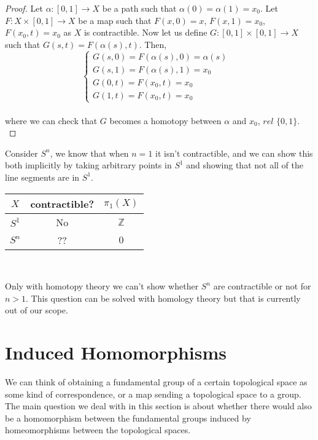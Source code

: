 \documentclass[paper=a4, fontsize=11pt]{scrartcl}
\begin{document}
\begin{proof}
	Let $\alpha:[0,1]\to X$ be a path such that $\alpha(0)=\alpha(1)=x_0$. Let $F:X\times[0,1]\to X$ be a map such that $F(x,0)=x$, $F(x,1)=x_0$, $F(x_0,t)=x_0$ as $X$ is contractible. Now let us define $G:[0,1]\times[0,1] \to X$ such that $G(s,t)=F(\alpha(s),t)$. Then, 
	\begin{equation}\nonumber
		\begin{cases}
		G(s,0)=F(\alpha(s),0)=\alpha(s) & \\
		G(s,1)=F(\alpha(s),1)=x_0 & \\
		G(0,t)=F(x_0,t)=x_0 & \\
		G(1,t)= F(x_0,t)=x_0
		\end{cases}
	\end{equation}\\
	where we can check that $G$ becomes a homotopy between $\alpha$ and $x_0$, $rel$ $\{0,1\}$.\\
\end{proof}

Consider $S^n$, we know that when $n=1$ it isn't contractible, and we can show this both implicitly by taking arbitrary points in $S^1$ and showing that not all of the line segments are in $S^1$. 

\begin{table}[h!]
	\centering
	\begin{tabular}{|c|c|c|}
		\hline
		$X$   & contractible? & $\pi_1(X)$   \\ \hline
		$S^1$ & No            & $\mathbb{Z}$ \\ \hline
		$S^n$ & ??            & $0$          \\ \hline
	\end{tabular}\\
\end{table}

Only with homotopy theory we can't show whether $S^n$ are contractible or not for $n>1$. This question can be solved with homology theory but that is currently out of our scope.  
\vspace{0.15in}


\section{Induced Homomorphisms}
\vspace{0.15in}
We can think of obtaining a fundamental group of a certain topological space as some kind of correspondence, or a map sending a topological space to a group. The main question we deal with in this section is about whether there would also be a homomorphism between the fundamental groups induced by homeomorphisms between the topological spaces. \\
\end{document}
